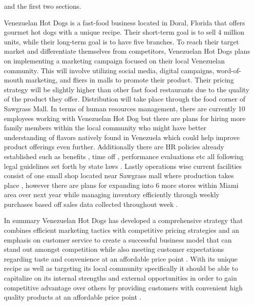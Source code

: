  and the first two sections. 

Venezuelan Hot Dogs is a fast-food business located in Doral, Florida that offers gourmet hot dogs with a unique recipe. Their short-term goal is to sell 4 million units, while their long-term goal is to have five branches. To reach their target market and differentiate themselves from competitors, Venezuelan Hot Dogs plans on implementing a marketing campaign focused on their local Venezuelan community. This will involve utilizing social media, digital campaigns, word-of-mouth marketing, and fliers in malls to promote their product. Their pricing strategy will be slightly higher than other fast food restaurants due to the quality of the product they offer. Distribution will take place through the food corner of Sawgrass Mall. In terms of human resources management, there are currently 10 employees working with Venezuelan Hot Dog but there are plans for hiring more family members within the local community who might have better understanding of flavors natively found in Venezuela which could help improve product offerings even further. Additionally there are HR policies already established such as benefits , time off , performance evaluations etc all following legal guidelines set forth by state laws . Lastly operations wise current facilities consist of one small shop located near Sawgrass mall where production takes place , however there are plans for expanding into 6 more stores within Miami area over next year while managing inventory efficiently through weekly purchases based off sales data collected throughout week . 

In summary Venezuelan Hot Dogs has developed a comprehensive strategy that combines efficient marketing tactics with competitive pricing strategies and an emphasis on customer service to create a successful business model that can stand out amongst competition while also meeting customer expectations regarding taste and convenience at an affordable price point . With its unique recipe as well as targeting its local community specifically it should be able to capitalize on its internal strengths and external opportunities in order to gain competitive advantage over others by providing customers with convenient high quality products at an affordable price point .